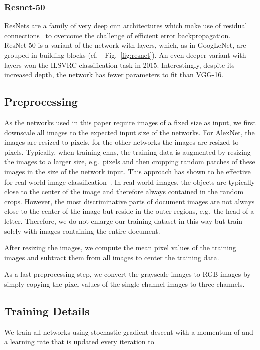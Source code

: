 \documentclass[conference]{IEEEtran}
\newcommand*{\eg}		{e.g.\ }
\newcommand*{\cf}		{cf.\ }
\begin{document}
\subsubsection{\textbf{Resnet-50}}
ResNets are a family of very deep \ac{cnn} architectures which make use of residual connections~\cite{he2016deep} to overcome the challenge of efficient error backpropagation. ResNet-50 is a variant of the network with  layers, which, as in GoogLeNet, are grouped in building blocks (\cf~Fig.~\ref{fig:resnet}). An even deeper variant with  layers won the ILSVRC classification task in 2015. Interestingly, despite its increased depth, the network has fewer parameters to fit than VGG-16.




\subsection{Preprocessing}

As the networks used in this paper require images of a fixed size as input, we first downscale all images to the expected input size of the networks. For AlexNet, the images are resized to  pixels, for the other networks the images are resized to  pixels.
Typically, when training \ac{cnn}s, the training data is augmented by resizing the images to a larger size, \eg  pixels and then cropping random patches of these images in the size of the network input. This approach has shown to be effective for real-world image classification~\cite{cnn_alexnet_nips2014}. In real-world images, the objects are typically close to the center of the image and therefore always contained in the random crops. However, the most discriminative parts of document images are not always close to the center of the image but reside in the outer regions, \eg the head of a letter. Therefore, we do not enlarge our training dataset in this way but train solely with images containing the entire document.

After resizing the images, we compute the mean pixel values of the training images and subtract them from all images to center the training data.

As a last preprocessing step, we convert the grayscale images to RGB images by simply copying the pixel values of the single-channel images to three channels.




\subsection{Training Details}
We train all networks using stochastic gradient descent with a momentum of  and a learning rate that is updated every iteration to
\end{document}
